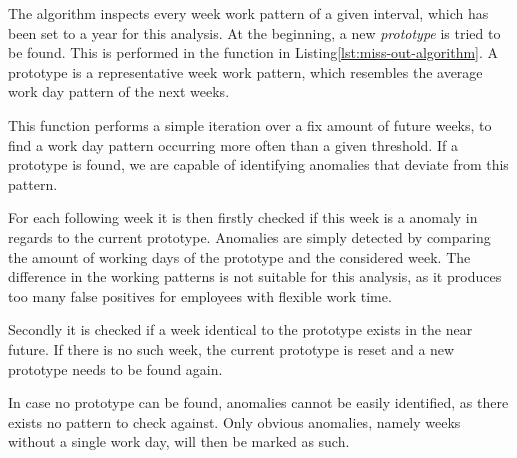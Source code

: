 The algorithm inspects every week work pattern of a given interval, which has been set to a year for this analysis.
At the beginning, a new \emph{prototype} is tried to be found.
This is performed in the function  in Listing\ref{lst:miss-out-algorithm}.
A prototype is a representative week work pattern, which resembles the average work day pattern of the next weeks.

This function performs a simple iteration over a fix amount of future weeks, to find a work day pattern occurring more often than a given threshold.
If a prototype is found, we are capable of identifying anomalies that deviate from this pattern.

For each following week it is then firstly checked if this week is a anomaly in regards to the current prototype.
Anomalies are simply detected by comparing the amount of working days of the prototype and the considered week.
The difference in the working patterns is not suitable for this analysis, as it produces too many false positives for employees with flexible work time.

Secondly it is checked if a week identical to the prototype exists in the near future.
If there is no such week, the current prototype is reset and a new prototype needs to be found again.

In case no prototype can be found, anomalies cannot be easily identified, as there exists no pattern to check against.
Only obvious anomalies, namely weeks without a single work day, will then be marked as such.
